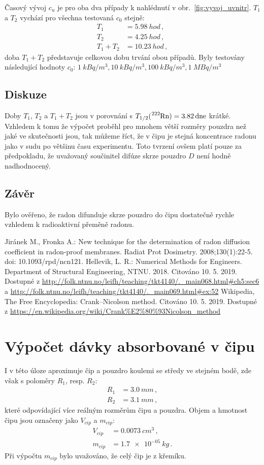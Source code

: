 \documentclass[11pt,a4paper]{article}
\begin{document}
Časový vývoj $c_u$ je pro oba dva případy k nahlédnutí v obr.~\ref{fig:vyvoj_uvnitr}. $T_1$ a $T_2$ vychází pro všechna testovaná $c_0$ stejně:
\begin{align}
	T_1&=\SI{5,98}{hod}\,,\\
	T_2&=\SI{4,25}{hod}\,,\\
	T_1+T_2&=\SI{10,23}{hod}\,,
\end{align}
doba $T_1+T_2$ představuje celkovou dobu trvání obou případů. Byly testovány následující hodnoty $c_0$: $\SI{1}{kBq/m^3}, \SI{10}{kBq/m^3}, \SI{100}{kBq/m^3}, \SI{1}{MBq/m^3}$
\subsection{Diskuze}
Doby $T_1$, $T_2$ a $T_1+T_2$ jsou v porovnání s $T_{1/2}(\ce{^{222}Rn})=\SI{3,82}{dne}$ krátké. Vzhledem k tomu že výpočet proběhl pro mnohem větší rozměry pouzdra než jaké ve skutečnosti jsou, tak můžeme říct, že v čipu je stejná koncentrace radonu jako v sudu po většinu času experimentu. Toto tvrzení ovšem platí pouze za předpokladu, že uvažovaný součinitel difúze skrze pouzdro $D$ není hodně nadhodnocený.
\subsection{Závěr}
Bylo ověřeno, že radon difunduje skrze pouzdro do čipu dostatečně rychle vzhledem k radioaktivní přeměně radonu.
\begin{thebibliography}{Mm99}
	 Jiránek M., Fronka A.: New technique for the determination of radon diffusion coefficient in radon-proof membranes. Radiat Prot Dosimetry. 2008;130(1):22-5. doi: 10.1093/rpd/ncn121.
	 Hellevik, L. R.: Numerical Methods for Engineers. Department of Structural Engineering, NTNU. 2018. Citováno 10. 5. 2019. Dostupné z \url{http://folk.ntnu.no/leifh/teaching/tkt4140/._main068.html#ch5:sec6} a \url{http://folk.ntnu.no/leifh/teaching/tkt4140/._main069.html#ex:52}
	 Wikipedia, The Free Encyclopedia: Crank–Nicolson method. Citováno 10. 5. 2019. Dostupné z \url{https://en.wikipedia.org/wiki/Crank%E2%80%93Nicolson_method}
	\end{thebibliography}
\section{Výpočet dávky absorbované v čipu}
I v této úloze aproximuje čip a pouzdro koulemi se středy ve stejném bodě, zde však s poloměry $R_1$, resp. $R_2$:
\begin{align}
	R_1&=\SI{3,0}{mm}\,,\\
	R_2&=\SI{3,1}{mm}\,,
\end{align}
které odpovídající více reálným rozměrům čipu a pouzdra. Objem a hmotnost čipu jsou označeny jako $V_{cip}$ a $m_{cip}$:
\begin{align}
	V_{cip}&=\SI{0,0073}{cm^3}\,,\\
	m_{cip}&=\SI{1.7e-05}{kg}\,.
\end{align}
Při výpočtu $m_{cip}$ bylo uvažováno, že celý čip je z křemíku. 
\end{document}
